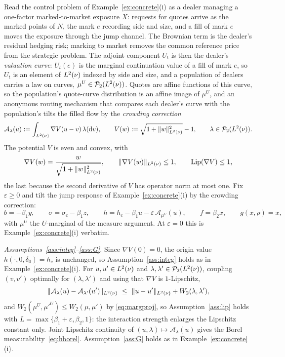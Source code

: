 \begin{example}\label{ex:dealer}
Read the control problem of Example~\ref{ex:concrete}(i) as a dealer managing a one-factor
marked-to-market exposure $X$: requests for quotes arrive as the marked points of $N$, the
mark $e$ recording side and size, and a fill of mark $e$ moves the exposure through the
jump channel. The Brownian term is the dealer's residual hedging risk; marking to market
removes the common reference price from the strategic problem. The adjoint component $U_t$ is then the dealer's \emph{valuation curve}:
$U_t(e)$ is the marginal continuation value of a fill of mark $e$, so $U_t$ is an element
of $L^2(\nu)$ indexed by side and size, and a population of dealers carries a law on curves,
$\mu^U\in\mathcal P_2(L^2(\nu))$. Quotes are affine functions of this curve, so the
population's quote-curve distribution is an affine image of $\mu^U$, and an anonymous
routing mechanism that compares each dealer's curve with the population's tilts the filled
flow by the \emph{crowding correction}
\[
\mathcal A_\lambda(u):=\int_{L^2(\nu)}\nabla V(u-v)\,\lambda(\mathrm{d} v),\qquad
V(w):=\sqrt{1+\lVert w\rVert_{L^2(\nu)}^2}-1,\qquad \lambda\in\mathcal P_2(L^2(\nu)).
\]
The potential $V$ is even and convex, with
\[
\nabla V(w)=\frac{w}{\sqrt{1+\lVert w\rVert_{L^2(\nu)}^2}},\qquad \lVert \nabla V(w)\rVert_{L^2(\nu)}\le1,\qquad
\mathrm{Lip}(\nabla V)\le1,
\]
the last because the second derivative of $V$ has operator norm at most one.
Fix $\varepsilon\ge0$ and tilt the jump response of Example~\ref{ex:concrete}(i) by the
crowding correction:
\[
b=-\beta_1 y,\qquad \sigma=\sigma_c-\beta_1 z,\qquad
h=h_c-\beta_1 u-\varepsilon\,\mathcal A_{\mu^U}(u),\qquad
f=\beta_2 x,\qquad g(x,\rho)=x ,
\]
with $\mu^U$ the $U$-marginal of the measure argument. At $\varepsilon=0$ this is
Example~\ref{ex:concrete}(i) verbatim.

\smallskip
\emph{Assumptions~\ref{ass:integ}--\ref{ass:G}.} Since $\nabla V(0)=0$, the origin value
$h(\cdot,0,\delta_0)=h_c$ is unchanged, so Assumption~\ref{ass:integ} holds as in
Example~\ref{ex:concrete}(i). For $u,u'\in L^2(\nu)$ and
$\lambda,\lambda'\in\mathcal P_2(L^2(\nu))$, coupling $(v,v')$ optimally for
$(\lambda,\lambda')$ and using that $\nabla V$ is $1$-Lipschitz,
\[
\lVert \mathcal A_\lambda(u)-\mathcal A_{\lambda'}(u')\rVert_{L^2(\nu)}
\ \le\ \lVert u-u'\rVert_{L^2(\nu)}+W_2(\lambda,\lambda') ,
\]
and $W_2(\mu^U,\mu'^U)\le W_2(\mu,\mu')$ by \eqref{eq:margproj}, so
Assumption~\ref{ass:lip} holds with $L=\max\{\beta_1+\varepsilon,\beta_2,1\}$: the
interaction strength enlarges the Lipschitz constant only. Joint Lipschitz continuity of
$(u,\lambda)\mapsto\mathcal A_\lambda(u)$ gives the Borel
measurability~\eqref{eq:hborel}. Assumption~\ref{ass:G} holds as in
Example~\ref{ex:concrete}(i).


\end{example}
